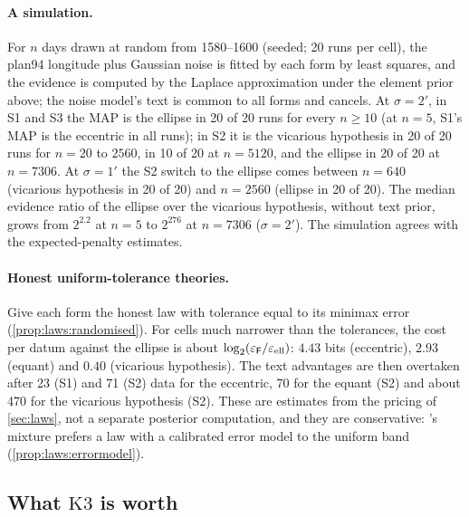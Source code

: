\paragraph{A simulation.} For $n$ days drawn at random from 1580--1600 (seeded; 20 runs per cell), the plan94 longitude plus Gaussian noise is fitted by each form by least squares, and the evidence is computed by the Laplace approximation under the element prior above; the noise model's text is common to all forms and cancels. At $\sigma=2'$, in S1 and S3 the MAP is the ellipse in 20 of 20 runs for every $n\ge10$ (at $n=5$, S1's MAP is the eccentric in all runs); in S2 it is the vicarious hypothesis in 20 of 20 runs for $n=20$ to $2560$, in 10 of 20 at $n=5120$, and the ellipse in 20 of 20 at $n=7306$. At $\sigma=1'$ the S2 switch to the ellipse comes between $n=640$ (vicarious hypothesis in 20 of 20) and $n=2560$ (ellipse in 20 of 20). The median evidence ratio of the ellipse over the vicarious hypothesis, without text prior, grows from $2^{2.2}$ at $n=5$ to $2^{276}$ at $n=7306$ ($\sigma=2'$). The simulation agrees with the expected-penalty estimates.

\paragraph{Honest uniform-tolerance theories.} Give each form the honest law with tolerance equal to its minimax error (\cref{prop:laws:randomised}). For cells much narrower than the tolerances, the cost per datum against the ellipse is about $\log_2(\varepsilon_{\mathsf F}/\varepsilon_{\rm ell})$: $4.43$ bits (eccentric), $2.93$ (equant) and $0.40$ (vicarious hypothesis). The text advantages are then overtaken after 23 (S1) and 71 (S2) data for the eccentric, 70 for the equant (S2) and about 470 for the vicarious hypothesis (S2). These are estimates from the pricing of \cref{sec:laws}, not a separate posterior computation, and they are conservative: \SAIabbr's mixture prefers a law with a calibrated error model to the uniform band (\cref{prop:laws:errormodel}).

\subsection{What \texorpdfstring{$\mathrm{K3}$}{K3} is worth}\label{sec:kepler:K3details}

